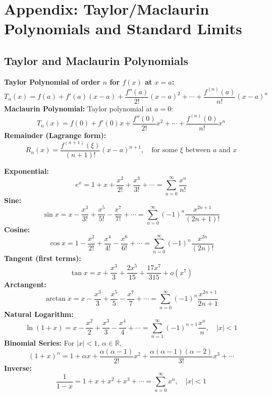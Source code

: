\section{Appendix: Taylor/Maclaurin Polynomials and Standard Limits}

\subsection{Taylor and Maclaurin Polynomials}

\begin{cascade}
	\textbf{Taylor Polynomial of order $n$ for $f(x)$ at $x=a$:}
	\[
		T_n(x) = f(a) + f'(a)(x-a) + \frac{f''(a)}{2!}(x-a)^2 + \cdots + \frac{f^{(n)}(a)}{n!}(x-a)^n
	\]
	\textbf{Maclaurin Polynomial:} Taylor polynomial at $a=0$:
	\[
		T_n(x) = f(0) + f'(0)x + \frac{f''(0)}{2!}x^2 + \cdots + \frac{f^{(n)}(0)}{n!}x^n
	\]
	\textbf{Remainder (Lagrange form):}
	\[
		R_n(x) = \frac{f^{(n+1)}(\xi)}{(n+1)!}(x-a)^{n+1}, \quad \text{for some } \xi \text{ between } a \text{ and } x
	\]
\end{cascade}

\begin{cascade}
	\textbf{Exponential:}
	\[
		e^x = 1 + x + \frac{x^2}{2!} + \frac{x^3}{3!} + \cdots = \sum_{n=0}^\infty \frac{x^n}{n!}
	\]
	\textbf{Sine:}
	\[
		\sin x = x - \frac{x^3}{3!} + \frac{x^5}{5!} - \frac{x^7}{7!} + \cdots = \sum_{n=0}^\infty (-1)^n \frac{x^{2n+1}}{(2n+1)!}
	\]
	\textbf{Cosine:}
	\[
		\cos x = 1 - \frac{x^2}{2!} + \frac{x^4}{4!} - \frac{x^6}{6!} + \cdots = \sum_{n=0}^\infty (-1)^n \frac{x^{2n}}{(2n)!}
	\]
	\textbf{Tangent (first terms):}
	\[
		\tan x = x + \frac{x^3}{3} + \frac{2x^5}{15} + \frac{17x^7}{315} + o(x^7)
	\]
	\textbf{Arctangent:}
	\[
		\arctan x = x - \frac{x^3}{3} + \frac{x^5}{5} - \frac{x^7}{7} + \cdots = \sum_{n=0}^\infty (-1)^n \frac{x^{2n+1}}{2n+1}
	\]
	\textbf{Natural Logarithm:}
	\[
		\ln(1+x) = x - \frac{x^2}{2} + \frac{x^3}{3} - \frac{x^4}{4} + \cdots = \sum_{n=1}^\infty (-1)^{n+1} \frac{x^n}{n}, \quad |x| < 1
	\]
	\textbf{Binomial Series:} For $|x|<1$, $\alpha \in \mathbb{R}$,
	\[
		(1+x)^\alpha = 1 + \alpha x + \frac{\alpha(\alpha-1)}{2!}x^2 + \frac{\alpha(\alpha-1)(\alpha-2)}{3!}x^3 + \cdots
	\]
	\textbf{Inverse:}
	\[
		\frac{1}{1-x} = 1 + x + x^2 + x^3 + \cdots = \sum_{n=0}^\infty x^n, \quad |x| < 1
	\]
\end{cascade}

